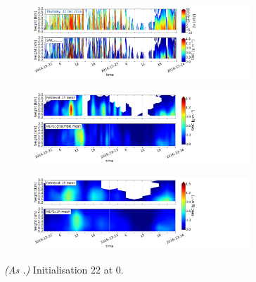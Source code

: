 \begin{figure}[H]
	\centering
	\begin{subfigure}[t]{1.05\textwidth}
		\centering
		\includegraphics[trim={0.cm 2.2cm 19.cm 0.5cm},clip,width=0.9\textwidth]{./fig_obs_ret/20161222}
		\caption{}\label{fig:SWC:ret_22}
	\end{subfigure}
	\begin{subfigure}[t]{1.05\textwidth}
		\centering
		\includegraphics[trim={0.cm 2.2cm 19.cm 0.5cm},clip,width=0.9\textwidth]{./fig_vert_SWC_EM/20161222}
		\caption{}\label{fig:SWC_EM:22}
	\end{subfigure}
	\begin{subfigure}[t]{1.05\textwidth}
		\centering
		\includegraphics[trim={0.cm 0.8cm 19.cm 0.5cm},clip,width=0.9\textwidth]{./fig_vert_SWC_3h/20161222}
		\caption{}\label{fig:SWC3h:22}
	\end{subfigure}
	\caption{\textit{(As .)} Initialisation \SI{22}{\dec} at \SI{0}{\UTC}.}\label{fig:SWC22}
\end{figure}
